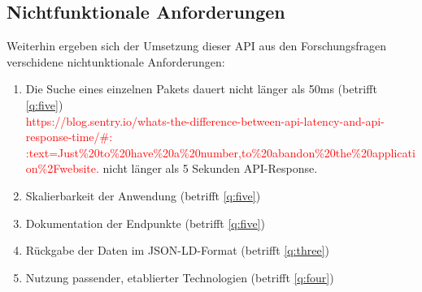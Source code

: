 \subsection{Nichtfunktionale Anforderungen} \label{sec:N_Anforderungen}
    Weiterhin ergeben sich der Umsetzung dieser \ac{API} aus den Forschungsfragen verschidene nichtunktionale Anforderungen:
    \begin{enumerate}[label=\textbf{NFRQ-\Roman*}, leftmargin=2.5cm]
        \item Die Suche eines einzelnen Pakets dauert nicht länger als 50ms (betrifft \ref{q:five}) \label{nf:one}
        \\
        \textcolor{red}{https://blog.sentry.io/whats-the-difference-between-api-latency-and-api-response-time/\#:$~$:text=Just\%20to\%20have\%20a\%20number,to\%20abandon\%20the\%20application\%2Fwebsite.} nicht länger als 5 Sekunden API-Response.
        \item Skalierbarkeit der Anwendung (betrifft \ref{q:five}) \label{nf:two}
        \item Dokumentation der Endpunkte (betrifft \ref{q:five}) \label{nf:three}
        \item Rückgabe der Daten im \acs{JSON-LD}-Format (betrifft \ref{q:three}) \label{nf:four}
        \item Nutzung passender, etablierter Technologien (betrifft \ref{q:four}) \label{nf:five}
    \end{enumerate}